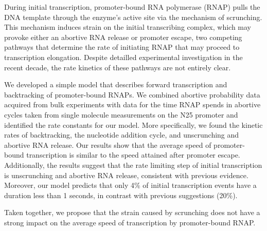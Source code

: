During initial transcription, promoter-bound RNA polymerase (RNAP) pulls the
DNA template through the enzyme's active site via the mechanism of scrunching.
This mechanism induces strain on the initial transcribing complex, which may
provoke either an abortive RNA release or promoter escape, two competing
pathways that determine the rate of initiating RNAP that may proceed to
transcription elongation. Despite detailled experimental investigation in the
recent decade, the rate kinetics of these pathways are not entirely clear.

We developed a simple model that describes forward transcription and
backtracking of promoter-bound RNAPs. We combined abortive probability data
acquired from bulk experiments with data for the time RNAP spends in abortive
cycles taken from single molecule measurements on the N25 promoter and
identified the rate constants for our model. More specifically, we found the
kinetic rates of backtracking, the nucleotide addition cycle, and unscrunching
and abortive RNA release. Our results show that the average speed of
promoter-bound transcription is similar to the speed attained after promoter
escape.  Additionally, the results suggest that the rate limiting step of
initial transcription is unscrunching and abortive RNA release, consistent
with previous evidence. Moreover, our model predicts that only 4\% of initial
transcription events have a duration less than 1 seconds, in contrast with
previous suggestions (20\%).  

Taken together, we propose that the strain caused by scrunching does not have
a strong impact on the average speed of transcription by promoter-bound RNAP.
